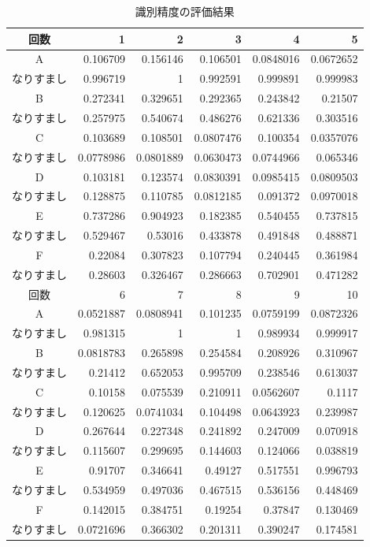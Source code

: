 \begin{table}[hbtp]
  \centering
  \caption{識別精度の評価結果}
  \label{auth-result}
  \begin{tabular}{|c|r|r|r|r|r|} \hline
    回数 & 1 & 2 & 3 & 4 & 5 \\ \hline
    A & 0.106709 & 0.156146 & 0.106501 & 0.0848016 & 0.0672652 \\
    なりすまし & 0.996719 & 1 & 0.992591 & 0.999891 & 0.999983 \\ \hline
    B & 0.272341 & 0.329651 & 0.292365 & 0.243842 & 0.21507 \\
    なりすまし & 0.257975 & 0.540674 & 0.486276 & 0.621336 & 0.303516 \\ \hline
    C & 0.103689 & 0.108501 & 0.0807476 & 0.100354 & 0.0357076 \\
    なりすまし & 0.0778986 & 0.0801889 & 0.0630473 & 0.0744966 & 0.065346 \\ \hline
    D & 0.103181 & 0.123574 & 0.0830391 & 0.0985415 & 0.0809503 \\
    なりすまし & 0.128875 & 0.110785 & 0.0812185 & 0.091372 & 0.0970018 \\ \hline
    E & 0.737286 & 0.904923 & 0.182385 & 0.540455 & 0.737815 \\
    なりすまし & 0.529467 & 0.53016 & 0.433878 & 0.491848 & 0.488871 \\ \hline
    F & 0.22084 & 0.307823 & 0.107794 & 0.240445 & 0.361984 \\
    なりすまし & 0.28603 & 0.326467 & 0.286663 & 0.702901 & 0.471282 \\ \hline \hline
    回数 & 6 & 7 & 8 & 9 & 10 \\ \hline
    A & 0.0521887 & 0.0808941 & 0.101235 & 0.0759199 & 0.0872326 \\
    なりすまし & 0.981315 & 1 & 1 & 0.989934 & 0.999917 \\ \hline
    B & 0.0818783 & 0.265898 & 0.254584 & 0.208926 & 0.310967 \\
    なりすまし & 0.21412 & 0.652053 & 0.995709 & 0.238546 & 0.613037 \\ \hline
    C & 0.10158 & 0.075539 & 0.210911 & 0.0562607 & 0.1117 \\
    なりすまし & 0.120625 & 0.0741034 & 0.104498 & 0.0643923 & 0.239987 \\ \hline
    D & 0.267644 & 0.227348 & 0.241892 & 0.247009 & 0.070918 \\
    なりすまし & 0.115607 & 0.299695 & 0.144603 & 0.124066 & 0.038819 \\ \hline
    E & 0.91707 & 0.346641 & 0.49127 & 0.517551 & 0.996793 \\
    なりすまし & 0.534959 & 0.497036 & 0.467515 & 0.536156  & 0.448469 \\ \hline
    F & 0.142015 & 0.384751 & 0.19254 & 0.37847 & 0.130469 \\
    なりすまし & 0.0721696 & 0.366302 & 0.201311 & 0.390247 & 0.174581 \\ \hline
  \end{tabular}
\end{table}


